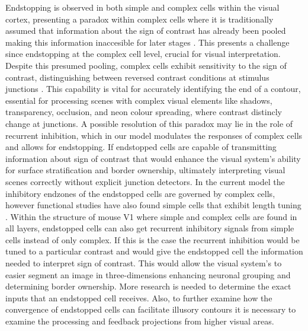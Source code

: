 \documentclass[12pt]{article}
\begin{document}
Endstopping is observed in both simple and complex cells within the visual cortex, presenting a paradox within complex cells where it is traditionally assumed that information about the sign of contrast has already been pooled making this information inaccesible for later stages \autocite{yazdanbakhshEndStoppingV12006}. This presents a challenge since endstopping at the complex cell level, crucial for visual interpretation. Despite this presumed pooling, complex cells exhibit sensitivity to the sign of contrast, distinguishing between reversed contrast conditions at stimulus junctions \autocite{yazdanbakhshEndStoppingV12006}. This capability is vital for accurately identifying the end of a contour, essential for processing scenes with complex visual elements like shadows, transparency, occlusion, and neon colour spreading, where contrast distincly change at junctions. A possible resolution of this paradox may lie in the role of recurrent inhibition, which in our model modulates the responses of complex cells and allows for endstopping. If endstopped cells are capable of transmitting information about sign of contrast that would enhance the visual system's ability for surface stratification and border ownership, ultimately interpreting visual scenes correctly without explicit junction detectors. In the current model the inhibitory endzones of the endstopped cells are governed by complex cells, however functional studies have also found simple cells that exhibit length tuning \autocite{andersonMembranePotentialConductance2001}. Within the structure of mouse V1 where simple and complex cells are found in all layers, endstopped cells can also get recurrent inhibitory signals from simple cells instead of only complex. If this is the case the recurrent inhibition would be tuned to a particular contrast and would give the endstopped cell the information needed to interpret sign of contrast. This would allow the visual system's to easier segment an image in three-dimensions enhancing neuronal grouping and determining border ownership. More research is needed to determine the exact inputs that an endstopped cell receives. Also, to further examine how the convergence of endstopped cells can facilitate illusory contours it is necessary to examine the processing and feedback projections from higher visual areas.
\end{document}
